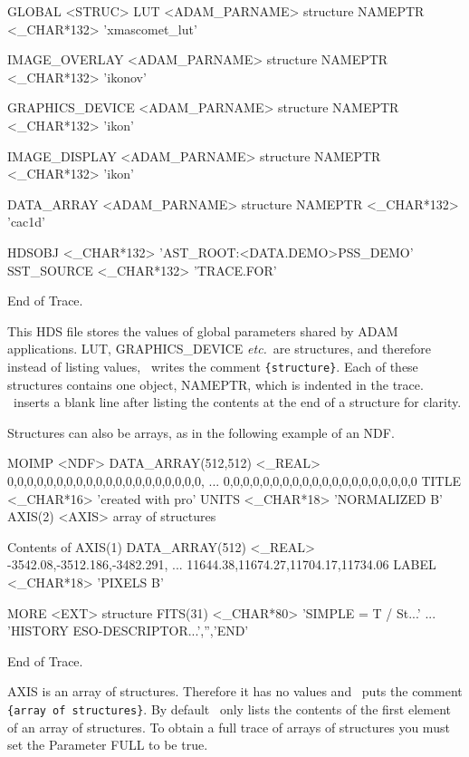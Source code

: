 \documentclass[11pt,nolof]{starlink}
\begin{document}
\small
\begin{terminalv}

GLOBAL  <STRUC>
  LUT            <ADAM_PARNAME>     {structure}
     NAMEPTR        <_CHAR*132>        'xmascomet_lut'

  IMAGE_OVERLAY  <ADAM_PARNAME>     {structure}
     NAMEPTR        <_CHAR*132>        'ikonov'

  GRAPHICS_DEVICE  <ADAM_PARNAME>   {structure}
     NAMEPTR        <_CHAR*132>        'ikon'

  IMAGE_DISPLAY  <ADAM_PARNAME>     {structure}
     NAMEPTR        <_CHAR*132>        'ikon'

  DATA_ARRAY     <ADAM_PARNAME>     {structure}
     NAMEPTR        <_CHAR*132>        'cac1d'

  HDSOBJ         <_CHAR*132>        'AST_ROOT:<DATA.DEMO>PSS_DEMO'
  SST_SOURCE     <_CHAR*132>        'TRACE.FOR'

End of Trace.
\end{terminalv}
\normalsize

This HDS file stores the values of global parameters shared by ADAM
applications.  LUT, GRAPHICS\_DEVICE \emph{etc.}\ are structures, and
therefore instead of listing values, \HDSTRACE\ writes the
comment \texttt{\{structure\}}.  Each of these structures contains one
object, NAMEPTR, which is indented in the trace.  \HDSTRACE\ inserts
a blank line after listing the contents at the end of a structure for
clarity.

Structures can also be arrays, as in the following example of an NDF.

\small
\begin{terminalv}

MOIMP  <NDF>
  DATA_ARRAY(512,512)  <_REAL>   0,0,0,0,0,0,0,0,0,0,0,0,0,0,0,0,0,0,0,0,
                                 ... 0,0,0,0,0,0,0,0,0,0,0,0,0,0,0,0,0,0,0,0
  TITLE          <_CHAR*16>      'created with pro'
  UNITS          <_CHAR*18>      'NORMALIZED       B'
  AXIS(2)        <AXIS>          {array of structures}

  Contents of AXIS(1)
     DATA_ARRAY(512)  <_REAL>       -3542.08,-3512.186,-3482.291,
                                    ... 11644.38,11674.27,11704.17,11734.06
     LABEL          <_CHAR*18>      'PIXELS           B'

  MORE           <EXT>           {structure}
     FITS(31)       <_CHAR*80>      'SIMPLE  =                    T / St...'
                                    ... 'HISTORY  ESO-DESCRIPTOR...','','END'

End of Trace.
\end{terminalv}
\normalsize
AXIS is an array of structures.  Therefore it has no values and
\HDSTRACE\ puts the comment \texttt{\{array of structures\}}.
By default \HDSTRACE\ only lists the contents of the first
element of an array of structures.  To obtain a full trace of arrays of
structures you must set the Parameter FULL to be true.
\end{document}
